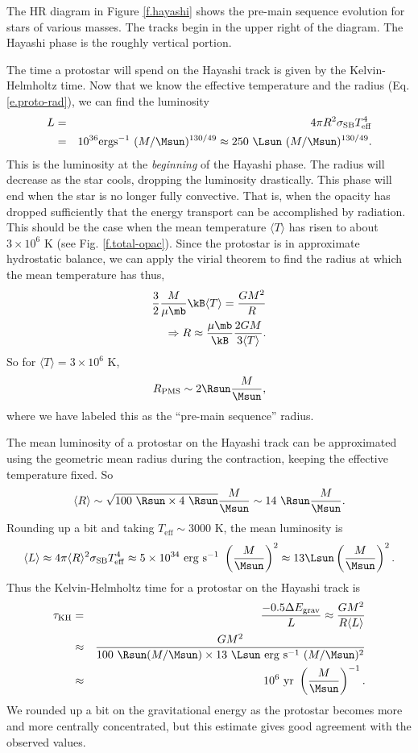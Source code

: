 The HR diagram in Figure \ref{f.hayashi} shows the pre-main sequence evolution for stars of various masses.
The tracks begin in the upper right of the diagram.
The Hayashi phase is the roughly vertical portion.

The time a protostar will spend on the Hayashi track is given by the Kelvin-Helmholtz time.
Now that we know the effective temperature and the radius (Eq. \ref{e.proto-rad}), we can find the luminosity
\begin{eqnarray*}
  L &=& 4\pi R^2 \sigma_\mathrm{SB} T_\mathrm{eff}^4 \\
    &=& 10^{36} \mathrm{erg s^{-1}}\ (M/\Msun)^{130/49} \approx 250\ \Lsun\ (M/\Msun)^{130/49}.
\end{eqnarray*}
This is the luminosity at the {\it beginning} of the Hayashi phase.
The radius will decrease as the star cools, dropping the luminosity drastically.
This phase will end when the star is no longer fully convective.
That is, when the opacity has dropped sufficiently that the energy transport can be accomplished by radiation.
This should be the case when the mean temperature $\langle T\rangle$ has risen to about $3\times10^6$ K (see Fig. \ref{f.total-opac}).
Since the protostar is in approximate hydrostatic balance, we can apply the virial theorem to find the radius at which the mean temperature has thus,
\begin{eqnarray}
  \frac{3}{2}\frac{M}{\mu \mb} \kB \langle T\rangle = \frac{GM^2}{R}\nonumber\\
  \Rightarrow R \approx \frac{\mu \mb}{\kB}\frac{2GM}{3\langle T\rangle}.
\end{eqnarray}
So for $\langle T\rangle = 3\times10^6$ K,
\begin{equation}
  R_\mathrm{PMS} \sim 2\Rsun \frac{M}{\Msun},
\end{equation}
where we have labeled this as the ``pre-main sequence'' radius.

The mean luminosity of a protostar on the Hayashi track can be approximated using the geometric mean radius during the contraction, keeping the effective temperature fixed.
So
\[ \langle R\rangle \sim \sqrt{100\ \Rsun \times 4\ \Rsun}\frac{M}{\Msun} \sim 14\ \Rsun\frac{M}{\Msun}.\]
Rounding up a bit and taking $T_\mathrm{eff}\sim3000$ K, the mean luminosity is
\[\langle L \rangle \approx 4\pi\langle R\rangle^2 \sigma_\mathrm{SB} T_\mathrm{eff}^4 \approx 5\times10^{34}\ \mathrm{erg\ s^{-1}}\ \left(\frac{M}{\Msun}\right)^2\approx 13 \Lsun \left(\frac{M}{\Msun}\right)^2. \]
Thus the Kelvin-Helmholtz time for a protostar on the Hayashi track is
\begin{eqnarray}
  \tau_\mathrm{KH} &=& \frac{-0.5\Delta E_\mathrm{grav}}{L} \approx \frac{GM^2}{R\langle L\rangle}\nonumber\\
  &\approx& \frac{GM^2}{100\ \Rsun (M/\Msun) \times 13\ \Lsun\ \mathrm{erg\ s^{-1}}\ (M/\Msun)^2}\nonumber\\
  &\approx& 10^6\ \mathrm{yr}\ \left(\frac{M}{\Msun}\right)^{-1}.
\end{eqnarray}
We rounded up a bit on the gravitational energy as the protostar becomes more and more centrally concentrated, but this estimate gives good agreement with the observed values.


